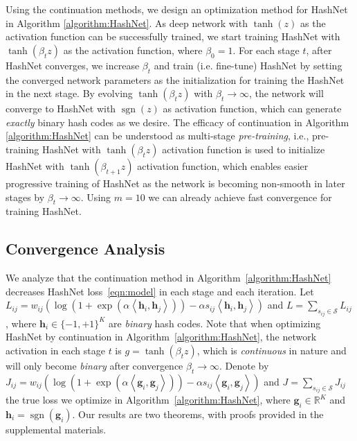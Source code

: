 \documentclass[10pt,twocolumn,letterpaper]{article}
\begin{document}
Using the continuation methods, we design an optimization method for HashNet in Algorithm \ref{algorithm:HashNet}. As deep network with $\operatorname{tanh}(z)$ as the activation function can be successfully trained, we start training HashNet with $\operatorname{tanh}(\beta_t z)$ as the activation function, where $\beta_0 = 1$. For each stage $t$, after HashNet converges, we increase $\beta_t$ and train (i.e. fine-tune) HashNet by setting the converged network parameters as the initialization for training the HashNet in the next stage. By evolving $\operatorname{tanh}(\beta_t z)$ with $\beta_t \rightarrow \infty$, the network will converge to HashNet with $\operatorname{sgn}(z)$ as activation function, which can generate \emph{exactly} binary hash codes as we desire. The efficacy of continuation in Algorithm \ref{algorithm:HashNet} can be understood as multi-stage \emph{pre-training}, i.e., pre-training HashNet with $\operatorname{tanh}(\beta_t z)$ activation function is used to initialize HashNet with $\operatorname{tanh}(\beta_{t+1} z)$ activation function, which enables easier progressive training of HashNet as the network is becoming non-smooth in later stages by $\beta_t \rightarrow \infty$. Using $m=10$ we can already achieve fast convergence for training HashNet.

\subsection{Convergence Analysis}\label{sec:convergence}
We analyze that the continuation method in Algorithm~\ref{algorithm:HashNet} decreases HashNet loss~\eqref{eqn:model} in each stage and each iteration.
Let $L_{ij} = {{w_{ij}}\left( {\log \left( {1 + \exp \left( {\alpha \left\langle {{{\bm{h}}_i},{{\bm{h}}_j}} \right\rangle } \right)} \right) - \alpha {s_{ij}}\left\langle {{{\bm{h}}_i},{{\bm{h}}_j}} \right\rangle } \right)}$ and $L = \sum\nolimits_{{s_{ij}} \in \mathcal{S}} L_{ij}$, where ${\bm h}_i \in \{-1,+1\}^K$ are \emph{binary} hash codes. 
Note that when optimizing HashNet by continuation in Algorithm~\ref{algorithm:HashNet}, the network activation in each stage $t$ is $g = \tanh(\beta_t z)$, which is \emph{continuous} in nature and will only become \emph{binary} after convergence ${\beta _t} \to \infty $. Denote by $J_{ij} = {{w_{ij}}\left( {\log \left( {1 + \exp \left( {\alpha \left\langle {{{\bm{g}}_i},{{\bm{g}}_j}} \right\rangle } \right)} \right) - \alpha {s_{ij}}\left\langle {{{\bm{g}}_i},{{\bm{g}}_j}} \right\rangle } \right)}$ and $J = \sum\nolimits_{{s_{ij}} \in \mathcal{S}} J_{ij}$ the true loss we optimize in Algorithm~\ref{algorithm:HashNet}, where ${\bm g}_i \in \mathbb{R}^K$ and ${\bm h}_i = \operatorname{sgn}({\bm g}_i)$. Our results are two theorems, with proofs provided in the supplemental materials.
\end{document}

